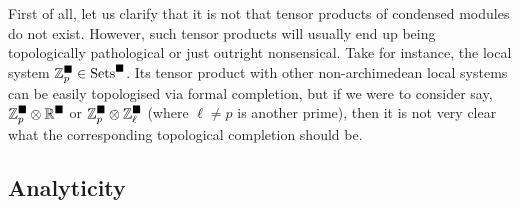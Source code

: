             First of all, let us clarify that it is not that tensor products of condensed modules do not exist. However, such tensor products will usually end up being topologically pathological or just outright nonsensical. Take for instance, the local system $\mathbb{Z}_p^{\blacksquare} \in \mathrm{Sets}^{\blacksquare}$. Its tensor product with other non-archimedean local systems can be easily topologised via formal completion, but if we were to consider say, $\Z_p^{\cond} \tensor \R^{\cond}$ or $\Z_p^{\cond} \tensor \Z_{\ell}^{\cond}$ (where $\ell \not = p$ is another prime), then it is not very clear what the corresponding topological completion should be.  
            
        \subsection{Analyticity}